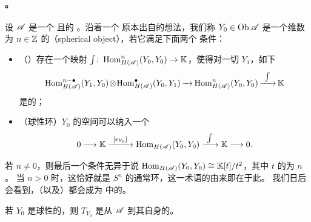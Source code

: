 \paragraph{\trSphericalObject{}。}\label{sub:spherical-objects}
设 $\mathscr{A}$ 是一个 \trCfinite{}且\trTriangulated{}的 \trACategory。沿着一个
原本出自\trKontsevich{}的想法，我们称 $Y_0\in\operatorname{Ob}\mathscr{A}$ 是一个维数为
$n\in\mathbb{Z}$ 的\textbf{\trSphericalObject}（spherical object），若它满足下面两个
条件：
\begin{itemize}
\item （\trPoincareDuality）存在一个\trLinear{}映射
$\int\colon\operatorname{Hom}^n_{H(\mathscr{A})}(Y_0,Y_0)\to\mathbb{K}$，使得对一切 $Y_1$，如下%
\trPairing
\begin{equation*}
\medmuskip=1.5mu\relax\thickmuskip=3mu\relax
\Hom^{n-\bullet}_{H(\scr{A})}(Y_1,Y_0)\otimes\Hom^{\bullet}_{H(\scr{A})}(Y_0,Y_1)
\xrightarrow{\ \text{\trComposition}\ }
\Hom^{n}_{H(\scr{A})}(Y_0,Y_0)
\xrightarrow{\ \int\ }\KK
\end{equation*}
是\trNondegenerate{}的；
\item （球性\trEndomorphism{}环）$Y_0$ 的\trEndomorphism{}空间可以纳入一个%
\trShortExactSequence
\begin{equation*}
0\longrightarrow\KK\xrightarrow{\ [e_{Y_0}]\ }\Hom_{H(\scr{A})}(Y_0,Y_0)
\xrightarrow{\ \int\ }\KK\longrightarrow 0.
\end{equation*}
\end{itemize}
若 $n\ne 0$，则最后一个条件无异于说
$\operatorname{Hom}_{H(\mathscr{A})}(Y_0,Y_0)\cong\mathbb{K}[t]/t^2$，其中 $t$ 的\trDegree{}为 $n$。
当 $n>0$ 时，这恰好就是 $S^n$ 的通常\trCohomology{}环，这一术语的由来即在于此。
我们日后会看到，\trLagrange{}\trSphere（以及\trHomology{}\trSphere）都会成为%
\trFukayaCategory{}中的\trSphericalObject。

\begin{lemma}\label{thm:spherical-twist-quasi-equivalence}
若 $Y_0$ 是球性的，则 $T_{Y_0}$ 是从 $\mathscr{A}$ 到其自身的\trQuasiequivalence。
\end{lemma}

